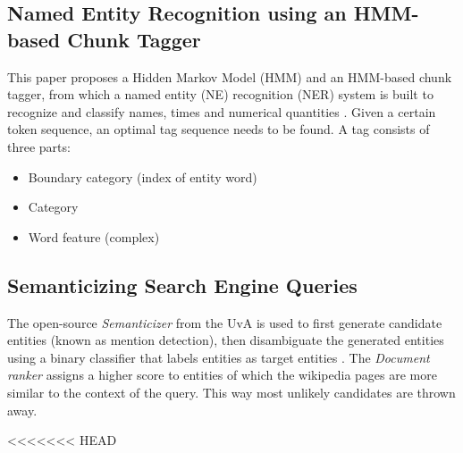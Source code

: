 \documentclass{article}
\begin{document}
\subsection*{Named Entity Recognition using an HMM-based Chunk Tagger}
This paper proposes a Hidden Markov Model (HMM) and an HMM-based chunk tagger, from which a named entity (NE)
recognition (NER) system is built to recognize and classify names, times and numerical quantities \cite{zhou2002named}. Given a certain token sequence, an optimal tag sequence needs to be found. A tag consists of three parts:
\begin{itemize}
    \item Boundary category (index of entity word)
    \item Category
    \item Word feature (complex)
\end{itemize}

\subsection*{Semanticizing Search Engine Queries}
The open-source \textit{Semanticizer} from the UvA is used to first generate candidate entities (known as mention detection), then disambiguate the generated entities using a binary classifier that labels entities as target entities \cite{graus2014semanticizing}. The \textit{Document ranker} assigns a higher score to entities of which the wikipedia pages are more similar to the context of the query. This way most unlikely candidates are thrown away.




<<<<<<< HEAD
\end{document}
